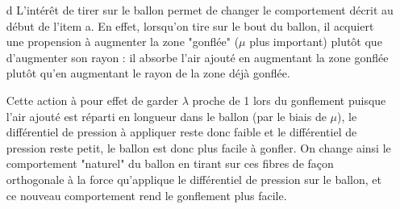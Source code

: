 \documentclass[a4paper,11pt]{article}
\begin{document}
\begin{enumerate}
\item[d]
L'intérêt de tirer sur le ballon permet de changer le comportement décrit au début de l'item a. En effet, lorsqu'on tire sur le bout du ballon, il acquiert une propension à augmenter la zone "gonflée" ($\mu$ plus important) plutôt que d'augmenter son rayon : il absorbe l'air ajouté en augmentant la zone gonflée plutôt qu'en augmentant le rayon de la zone déjà gonflée.

\hspace{0.8cm}Cette action à pour effet de garder $\lambda$ proche de 1 lors du gonflement puisque l'air ajouté est réparti en longueur dans le ballon (par le biais de $\mu$), le différentiel de pression à appliquer reste donc faible et le différentiel de pression reste petit, le ballon est donc plus facile à gonfler. On change ainsi le comportement "naturel" du ballon en tirant sur ces fibres de façon orthogonale à la force qu'applique le différentiel de pression sur le ballon, et ce nouveau comportement rend le gonflement plus facile.
\end{enumerate}
\end{document}
